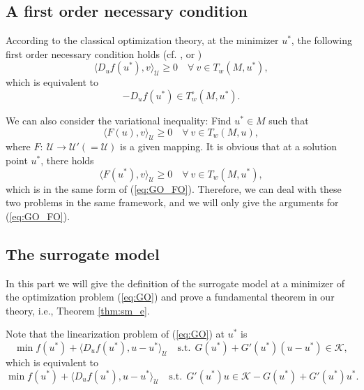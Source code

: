 \documentclass[leqno]{amsart}
\theoremstyle{definition}
\begin{document}
\subsection{A first order necessary condition}
According to the classical optimization theory, at the minimizer $u^*$, the following first order necessary condition holds (cf. \cite[Theorem 1]{guignard1969generalized}, \cite[Proposition 1.2]{ito2008lagrange} or \cite[Theorem 4.14]{jahn2020introduction})
\begin{equation}\label{eq:GO_FO}
\langle D_uf(u^*), v\rangle_\mathcal{U}\geq 0\quad \forall\ v\in T_w(M,u^*),
\end{equation}
which is equivalent to 
$$ -D_uf(u^*) \in T_w^{\circ}(M,u^*).$$

We can also consider the variational inequality: Find $u^*\in M$ such that
\begin{equation}\label{eq:VI}
\langle F(u), v\rangle_\mathcal{U}\geq 0\quad \forall\ v\in T_w(M, u),
\end{equation}
where $F:\ \mathcal{U}\rightarrow  \mathcal{U}' (=  \mathcal{U}) $ is a given mapping. It is obvious that at a solution point $u^*$, there holds
$$\langle F(u^*), v\rangle_\mathcal{U}\geq 0\quad \forall\ v\in T_w(M, u^*),$$
which is in the same form of (\ref{eq:GO_FO}).
Therefore, we can deal with these two problems in the same framework, and we will only give the arguments for (\ref{eq:GO_FO}).

\subsection{The surrogate model} In this part we will give the definition of the surrogate model at a minimizer of the optimization problem (\ref{eq:GO}) and prove a fundamental theorem in our theory, i.e., Theorem \ref{thm:sm_e}. 

Note that the linearization problem  of (\ref{eq:GO})  at $u^*$ is 
\begin{equation}\nonumber
\min f(u^*) + \langle D_uf(u^*), u - u^*\rangle_{\mathcal{U}} \quad \mbox{s.t.}\ \ G(u^*) + G'(u^*)(u - u^*) \in \mathcal{K},
\end{equation}
which is equivalent to
\begin{equation}\nonumber
\min f(u^*) + \langle D_uf(u^*), u - u^*\rangle_{\mathcal{U}} \quad \mbox{s.t.}\ \  G'(u^*)u \in \mathcal{K} - G(u^*) + G'(u^*)u^*.
\end{equation}
\end{document}
